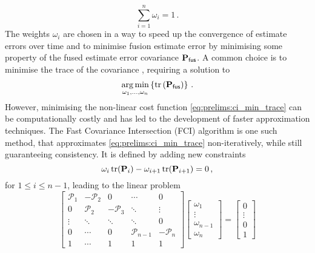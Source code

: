 \begin{equation}\label{eq:prelims:ci_weight_sum}
    \sum_{i=1}^n \omega_i = 1\,.
\end{equation}
The weights $\omega_i$ are chosen in a way to speed up the convergence of estimate errors over time and to minimise fusion estimate error by minimising some property of the fused estimate error covariance ${{\mathbf{P}}}_{\mathsf{fus}}$. A common choice is to minimise the trace of the covariance \cite{funkConservativeQuantizationFast2020,chenEstimationUnknownCorrelation2002,arambelCovarianceIntersectionAlgorithm2001}, requiring a solution to
\begin{equation}\label{eq:prelims:ci_min_trace}
    \operatorname*{arg\,min}_{\omega_1,\dots,\omega_n} \left\{\operatorname{tr}\left({{\mathbf{P}}}_{\mathsf{fus}}\right)\right\}\,.
 \end{equation}
However, minimising the non-linear cost function \eqref{eq:prelims:ci_min_trace} can be computationally costly and has led to the development of faster approximation techniques. The Fast Covariance Intersection (FCI) algorithm \cite{niehsenInformationFusionBased2002} is one such method, that approximates \eqref{eq:prelims:ci_min_trace} non-iteratively, while still guaranteeing consistency. It is defined by adding new constraints
\begin{equation}\label{eq:prelims:fci_added_constraints}
   \omega_i \operatorname{tr}({{\mathbf{P}}}_i) - \omega_{i+1} \operatorname{tr}({{\mathbf{P}}}_{i+1}) = 0\,,
\end{equation}
for $1\leq i\leq n-1$, leading to the linear problem
\begin{equation}\label{eq:prelims:fci_matrix_equation}
    \begin{bmatrix}
        \mathcal{P}_1 & -\mathcal{P}_2 & 0 & \cdots & 0 \\
        0 & \mathcal{P}_2 & -\mathcal{P}_3 & \ddots & \vdots \\
        \vdots & \ddots & \ddots & \ddots & 0 \\
        0 & \cdots & 0 & \mathcal{P}_{n-1} & -\mathcal{P}_n \\
        1 & \cdots & 1 & 1 & 1
    \end{bmatrix}
    \begin{bmatrix}
        \omega_1 \\
        \vdots \\
        \omega_{n-1} \\
        \omega_n
    \end{bmatrix}
    =
    \begin{bmatrix}
        0 \\
        \vdots \\
        0 \\
        1
    \end{bmatrix}
\end{equation}
